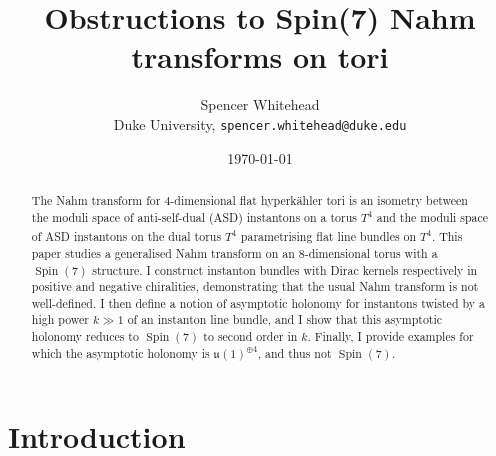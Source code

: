 \documentclass{article}
\title{Obstructions to Spin(7) Nahm transforms on tori}
\author{Spencer Whitehead \\ \small Duke University, \texttt{spencer.whitehead@duke.edu}}
\date{\today}
\newcommand{\wh}{\widehat}
\DeclareMathOperator\Spin{Spin}
\theoremstyle{definition}
\theoremstyle{remark}
\begin{document}
\maketitle

\begin{abstract}
    The Nahm transform for 4-dimensional flat hyperk\"ahler tori is an isometry between the moduli space of anti-self-dual (ASD) instantons on a torus $T^4$ and the moduli space of ASD instantons on the dual torus $\wh{T^4}$ parametrising flat line bundles on $T^4$.
    This paper studies a generalised Nahm transform on an 8-dimensional torus with a $\Spin(7)$ structure.
    I construct instanton bundles with Dirac kernels respectively in positive and negative chiralities, demonstrating that the usual Nahm transform is not well-defined.
    I then define a notion of asymptotic holonomy for instantons twisted by a high power $k \gg 1$ of an instanton line bundle, and I show that this asymptotic holonomy reduces to $\Spin(7)$ to second order in $k$.
    Finally, I provide examples for which the asymptotic holonomy is $\mathfrak{u}(1)^{\oplus 4}$, and thus not $\Spin(7)$.
\end{abstract}

\section{Introduction}
\label{sec:introduction}
\end{document}
